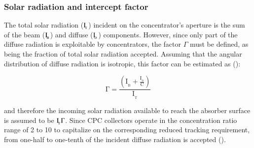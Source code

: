 %
%
%

\subsubsection{Solar radiation and intercept factor}

The total solar radiation ($\rm{I_{\!_{T}}}$) incident on the concentrator's aperture is the sum of the beam ($\rm{I_{\!_{B}}}$) and diffuse ($\rm{I_{\!_{D}}}$) components. However, since only part of the diffuse radiation is exploitable by concentrators, the factor $\Gamma$ must be defined, as being the fraction of total solar radiation accepted. Assuming that the angular distribution of diffuse radiation is isotropic, this factor can be estimated as (\cite{Rabl1980}):

\begin{equation}
	\mathrm{\Gamma  = \frac{\displaystyle {\left( {{I_{\!_B}} + \frac{{{I_{\!_D}}}}{C}} \right)}}{{{I_{\!_T}}}}}
	\label{xi}
\end{equation} 

\noindent and therefore the incoming solar radiation available to reach the absorber surface is assumed to be $\rm{I_{\!_T}\Gamma}$. Since CPC collectors operate in the concentration ratio range of 2 to 10 to capitalize on the corresponding reduced tracking requirement, from one-half to one-tenth of the incident diffuse radiation is accepted (\cite{Goswami2015}). 

